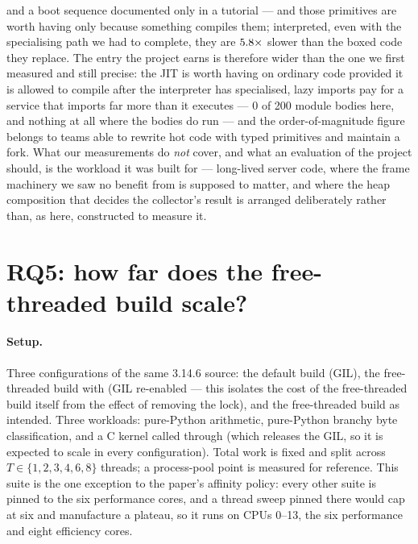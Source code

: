 and a boot sequence documented only in a tutorial --- and those primitives are worth having only
because something compiles them; interpreted, even with the specialising path we had to
complete, they are $\meas{ratio:b6_static-fork_static_adaptive:matmul96_int/fork_static_adaptive/static_interp|b6_static-fork_static_adaptive:matmul96_int/fork_static_adaptive/boxed_python}{5.8}\times$ slower than the boxed code they replace. The entry the project
earns is therefore wider than the one we first measured and still precise: the JIT is worth
having on ordinary code provided it is allowed to compile after the interpreter has
specialised, lazy imports pay for a service that imports far more than it executes --- 0 of 200
module bodies here, and nothing at all where the bodies do run --- and the order-of-magnitude figure
belongs to teams able to rewrite hot code with typed primitives and maintain a fork. What our measurements do
\emph{not} cover, and what an evaluation of the project should, is the workload it was built
for --- long-lived server code, where the frame machinery we saw no benefit from is supposed
to matter, and where the heap composition that decides the collector's result is arranged
deliberately rather than, as here, constructed to measure it.

\section{RQ5: how far does the free-threaded build scale?}
\label{sec:rq5}


\paragraph{Setup.} Three configurations of the same 3.14.6 source: the default build (GIL),
the free-threaded build with  (GIL re-enabled --- this isolates the
cost of the free-threaded build itself from the effect of removing the lock), and the
free-threaded build as intended. Three workloads: pure-Python arithmetic, pure-Python
branchy byte classification, and a C kernel called through  (which releases
the GIL, so it is expected to scale in every configuration). Total work is fixed and split
across $T \in \{1,2,3,4,6,8\}$ threads; a process-pool point is measured for reference. This
suite is the one exception to the paper's affinity policy: every other suite is pinned to the
six performance cores, and a thread sweep pinned there would cap at six and manufacture a
plateau, so it runs on CPUs 0--13, the six performance and eight efficiency cores.

